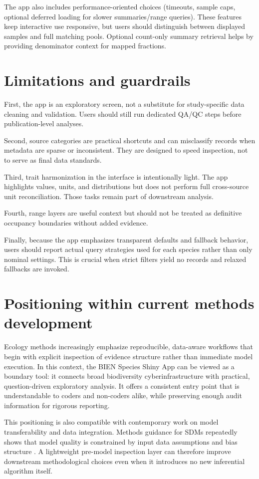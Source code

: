 \documentclass[11pt]{article}
\begin{document}
The app also includes performance-oriented choices (timeouts, sample caps, optional deferred loading for slower summaries/range queries). These features keep interactive use responsive, but users should distinguish between displayed samples and full matching pools. Optional count-only summary retrieval helps by providing denominator context for mapped fractions.

\section*{Limitations and guardrails}
First, the app is an exploratory screen, not a substitute for study-specific data cleaning and validation. Users should still run dedicated QA/QC steps before publication-level analyses.

Second, source categories are practical shortcuts and can misclassify records when metadata are sparse or inconsistent. They are designed to speed inspection, not to serve as final data standards.

Third, trait harmonization in the interface is intentionally light. The app highlights values, units, and distributions but does not perform full cross-source unit reconciliation. Those tasks remain part of downstream analysis.

Fourth, range layers are useful context but should not be treated as definitive occupancy boundaries without added evidence.

Finally, because the app emphasizes transparent defaults and fallback behavior, users should report actual query strategies used for each species rather than only nominal settings. This is crucial when strict filters yield no records and relaxed fallbacks are invoked.

\section*{Positioning within current methods development}
Ecology methods increasingly emphasize reproducible, data-aware workflows that begin with explicit inspection of evidence structure rather than immediate model execution. In this context, the BIEN Species Shiny App can be viewed as a boundary tool: it connects broad biodiversity cyberinfrastructure with practical, question-driven exploratory analysis. It offers a consistent entry point that is understandable to coders and non-coders alike, while preserving enough audit information for rigorous reporting.

This positioning is also compatible with contemporary work on model transferability and data integration. Methods guidance for SDMs repeatedly shows that model quality is constrained by input data assumptions and bias structure \citep{Merow2013MaxEntGuide, Merow2016ExpertMaps}. A lightweight pre-model inspection layer can therefore improve downstream methodological choices even when it introduces no new inferential algorithm itself.
\end{document}
